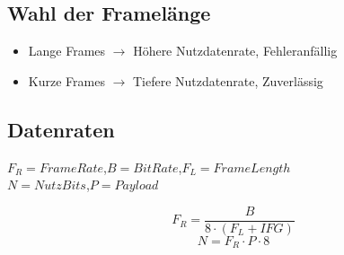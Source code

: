 \subsection{Wahl der Framelänge}{
    \begin{itemize}[noitemsep]
        \item Lange Frames $\to$ Höhere Nutzdatenrate, Fehleranfällig
        \item Kurze Frames $\to$ Tiefere Nutzdatenrate, Zuverlässig
    \end{itemize}
}
\subsection{Datenraten}{
    $F_R = FrameRate$,$B=BitRate$,$F_L = FrameLength$ \\
    $ N = NutzBits $,$P = Payload$

    $$ F_R = \frac{B}{8 \cdot (F_L + IFG)} $$
    $$ N = F_R \cdot P \cdot 8 $$
   
}


